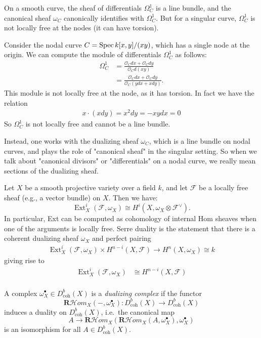 \documentclass[12pt]{article}
\begin{document}
On a smooth curve, the sheaf of differentials $\Omega^1_C$ is a line bundle, and the canonical sheaf $\omega_C$ canonically identifies with $\Omega^1_C$. But for a singular curve, $\Omega^1_C$ is not locally free at the nodes (it can have torsion).

\begin{example}
    Consider the nodal curve $C = \operatorname{Spec} k[x,y]/(xy)$, which has a single node at the origin. We can compute the module of differentials $\Omega^1_C$ as follows:
    \begin{align*}
        \Omega^1_C &= \frac{\mathcal{O}_C dx + \mathcal{O}_C dy}{\mathcal{O}_C d(xy)} \\
        &= \frac{\mathcal{O}_C dx + \mathcal{O}_C dy}{\mathcal{O}_C (y dx + x dy)}.
    \end{align*}
    This module is not locally free at the node, as it has torsion. In fact we have the relation \begin{align*}
        x \cdot (xdy) = x^2 dy = -xy dx = 0
    \end{align*}
    So $\Omega^1_C$ is not locally free and cannot be a line bundle.
\end{example}


Instead, one works with the dualizing sheaf $\omega_C$, which is a line bundle on nodal curves, and plays the role of "canonical sheaf" in the singular setting. So when we talk about "canonical divisors" or "differentials" on a nodal curve, we really mean sections of the dualizing sheaf. 

Let $X$ be a smooth projective variety over a field $k$, and let $\mathcal{F}$ be a locally free sheaf (e.g., a vector bundle) on $X$. Then we have:
\[
\operatorname{Ext}^i_X(\mathcal{F}, \omega_X) \cong H^i(X, \omega_X \otimes \mathcal{F}^\vee).
\]
In particular, Ext can be computed as cohomology of internal Hom sheaves when one of the arguments is locally free. Serre duality is the statement that there is a coherent dualizing sheaf $\omega_X$ and perfect pairing \begin{align*}
    \operatorname{Ext}^i_X(\mathcal{F}, \omega_X) \times H^{n-i}(X, \mathcal{F}) \to H^n(X, \omega_X) \cong k
\end{align*} giving rise to
\begin{align*}
    \operatorname{Ext}^i_X(\mathcal{F}, \omega_X) &\cong H^{n-i}(X, \mathcal{F}) \\
\end{align*}

\begin{definition}
A complex $\omega_X^\bullet\in D^b_{\operatorname{coh}}(X)$ is a \emph{dualizing complex} if the functor
\[
\mathbf R\!\mathcal Hom_X(-,\omega_X^\bullet):D^b_{\operatorname{coh}}(X)\longrightarrow D^b_{\operatorname{coh}}(X)
\]
induces a duality on $D^b_{\operatorname{coh}}(X)$, i.e.\ the canonical map
\[
A\longrightarrow \mathbf R\!\mathcal Hom_X(\mathbf R\!\mathcal Hom_X(A,\omega_X^\bullet),\omega_X^\bullet)
\]
is an isomorphism for all $A\in D^b_{\operatorname{coh}}(X)$.
\end{definition}
\end{document}
